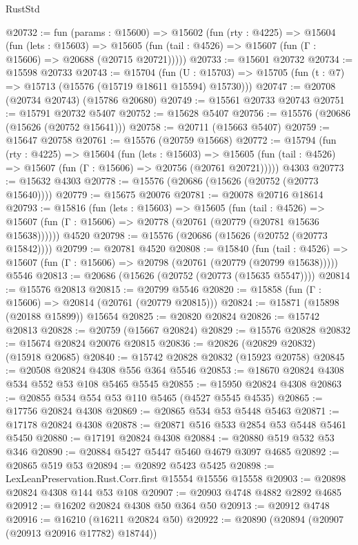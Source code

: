 \begin{lexlean}{RustStd}
\begin{coremodule}
@20732 := fun (params : @15600) =>
  @15602
    (fun (rty : @4225) =>
    @15604
      (fun (lets : @15603) =>
      @15605 (fun (tail : @4526) => @15607 (fun (Γ : @15606) => @20688 (@20715 @20721)))))
@20733 := @15601 @20732
@20734 := @15598 @20733
@20743 := @15704
    (fun (U : @15703) => @15705 (fun (t : @7) => @15713 (@15576 (@15719 @18611 @15594) @15730)))
@20747 := @20708 (@20734 @20743) (@15786 @20680)
@20749 := @15561 @20733 @20743
@20751 := @15791 @20732 @5407
@20752 := @15628 @5407
@20756 := @15576 (@20686 (@15626 (@20752 @15641)))
@20758 := @20711 (@15663 @5407)
@20759 := @15647 @20758
@20761 := @15576 (@20759 @15668)
@20772 := @15794
    (fun (rty : @4225) =>
    @15604
      (fun (lets : @15603) =>
      @15605 (fun (tail : @4526) => @15607 (fun (Γ : @15606) => @20756 (@20761 @20721)))))
    @4303
@20773 := @15632 @4303
@20778 := @15576 (@20686 (@15626 (@20752 (@20773 @15640))))
@20779 := @15675 @20076
@20781 := @20078 @20716 @18614
@20793 := @15816
    (fun (lets : @15603) =>
    @15605
      (fun (tail : @4526) =>
      @15607 (fun (Γ : @15606) => @20778 (@20761 (@20779 (@20781 @15636 @15638))))))
    @4520
@20798 := @15576 (@20686 (@15626 (@20752 (@20773 @15842))))
@20799 := @20781 @4520
@20808 := @15840
    (fun (tail : @4526) => @15607 (fun (Γ : @15606) => @20798 (@20761 (@20779 (@20799 @15638)))))
    @5546
@20813 := @20686 (@15626 (@20752 (@20773 (@15635 @5547))))
@20814 := @15576 @20813
@20815 := @20799 @5546
@20820 := @15858 (fun (Γ : @15606) => @20814 (@20761 (@20779 @20815)))
@20824 := @15871 (@15898 (@20188 @15899)) @15654
@20825 := @20820 @20824
@20826 := @15742 @20813
@20828 := @20759 (@15667 @20824)
@20829 := @15576 @20828
@20832 := @15674 @20824 @20076 @20815
@20836 := @20826 (@20829 @20832) (@15918 @20685)
@20840 := @15742 @20828 @20832 (@15923 @20758)
@20845 := @20508 @20824 @4308 @556 @364 @5546
@20853 := @18670 @20824 @4308 @534 @552 @53 @108 @5465 @5545
@20855 := @15950 @20824 @4308
@20863 := @20855 @534 @554 @53 @110 @5465 (@4527 @5545 @4535)
@20865 := @17756 @20824 @4308
@20869 := @20865 @534 @53 @5448 @5463
@20871 := @17178 @20824 @4308
@20878 := @20871 @516 @533 @2854 @53 @5448 @5461 @5450
@20880 := @17191 @20824 @4308
@20884 := @20880 @519 @532 @53 @346
@20890 := @20884 @5427 @5447 @5460 @4679 @3097 @4685
@20892 := @20865 @519 @53
@20894 := @20892 @5423 @5425
@20898 := LexLeanPreservation.Rust.Corr.first @15554 @15556 @15558
@20903 := @20898 @20824 @4308 @144 @53 @108
@20907 := @20903 @4748 @4882 @2892 @4685
@20912 := @16202 @20824 @4308 @50 @364 @50
@20913 := @20912 @4748
@20916 := @16210 (@16211 @20824 @50)
@20922 := @20890 (@20894 (@20907 (@20913 @20916 @17782) @18744))

\end{coremodule}
\end{lexlean}
